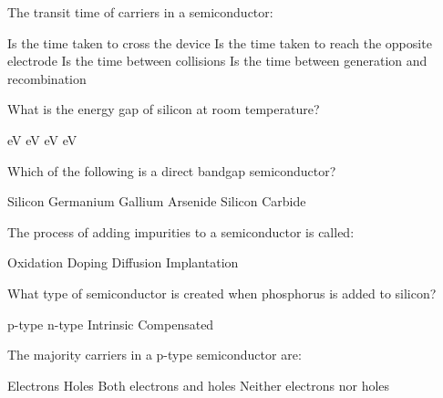 \begin{question}[2]
The transit time of carriers in a semiconductor:

\begin{oneparcheckboxes}
\choice Is the time taken to cross the device
\correctchoice Is the time taken to reach the opposite electrode
\choice Is the time between collisions
\choice Is the time between generation and recombination
\end{oneparcheckboxes}
\end{question}

\begin{question}[2]
What is the energy gap of silicon at room temperature?
\begin{oneparcheckboxes}
 eV
 eV
 eV
 eV
\end{oneparcheckboxes}
\end{question}

\begin{question}[2]
Which of the following is a direct bandgap semiconductor?
\begin{oneparcheckboxes}
\choice Silicon
\choice Germanium
\correctchoice Gallium Arsenide
\choice Silicon Carbide
\end{oneparcheckboxes}
\end{question}

\begin{question}[2]
The process of adding impurities to a semiconductor is called:
\begin{oneparcheckboxes}
\choice Oxidation
\correctchoice Doping
\choice Diffusion
\choice Implantation
\end{oneparcheckboxes}
\end{question}

\begin{question}[2]
What type of semiconductor is created when phosphorus is added to silicon?
\begin{oneparcheckboxes}
\choice p-type
\correctchoice n-type
\choice Intrinsic
\choice Compensated
\end{oneparcheckboxes}
\end{question}

\begin{question}[2]
The majority carriers in a p-type semiconductor are:
\begin{oneparcheckboxes}
\choice Electrons
\correctchoice Holes
\choice Both electrons and holes
\choice Neither electrons nor holes
\end{oneparcheckboxes}
\end{question} 